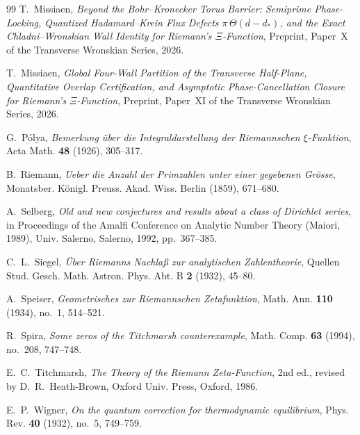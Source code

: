 \documentclass[11pt,reqno]{amsart}
\theoremstyle{definition}
\theoremstyle{remark}
\numberwithin{equation}{section}
\begin{document}
\begin{thebibliography}{99}
T.~Missiaen,
\emph{Beyond the Bohr--Kronecker Torus Barrier: Semiprime Phase-Locking, Quantized Hadamard--Krein Flux Defects $\pi\,\Theta(d - d_*)$, and the Exact Chladni--Wronskian Wall Identity for Riemann's $\Xi$-Function},
Preprint, Paper~X of the Transverse Wronskian Series, 2026.

T.~Missiaen,
\emph{Global Four-Wall Partition of the Transverse Half-Plane, Quantitative Overlap Certification, and Asymptotic Phase-Cancellation Closure for Riemann's $\Xi$-Function},
Preprint, Paper~XI of the Transverse Wronskian Series, 2026.

G.~P\'olya,
\emph{Bemerkung \"uber die Integraldarstellung der Riemannschen $\xi$-Funktion},
Acta Math. \textbf{48} (1926), 305--317.

B.~Riemann,
\emph{Ueber die Anzahl der Primzahlen unter einer gegebenen Gr\"osse},
Monatsber. K\"onigl. Preuss. Akad. Wiss. Berlin (1859), 671--680.

A.~Selberg,
\emph{Old and new conjectures and results about a class of Dirichlet series},
in Proceedings of the Amalfi Conference on Analytic Number Theory (Maiori, 1989), Univ. Salerno, Salerno, 1992, pp.~367--385.

C.~L.~Siegel,
\emph{\"Uber Riemanns Nachla\ss{} zur analytischen Zahlentheorie},
Quellen Stud. Gesch. Math. Astron. Phys. Abt. B \textbf{2} (1932), 45--80.

A.~Speiser,
\emph{Geometrisches zur Riemannschen Zetafunktion},
Math. Ann. \textbf{110} (1934), no.~1, 514--521.

R.~Spira,
\emph{Some zeros of the Titchmarsh counterexample},
Math. Comp. \textbf{63} (1994), no.~208, 747--748.

E.~C.~Titchmarsh,
\emph{The Theory of the Riemann Zeta-Function},
2nd ed., revised by D.~R.~Heath-Brown, Oxford Univ. Press, Oxford, 1986.

E.~P.~Wigner,
\emph{On the quantum correction for thermodynamic equilibrium},
Phys. Rev. \textbf{40} (1932), no.~5, 749--759.

\end{thebibliography}
\end{document}
